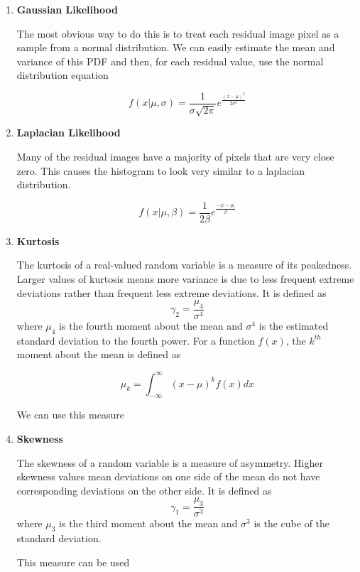 \begin{enumerate}
\item{\textbf{Gaussian Likelihood}}

The most obvious way to do this is to treat each residual image pixel as a sample from a normal distribution.  We can easily estimate the mean and variance of this PDF and then, for each residual value, use the normal distribution equation 

$$f(x|\mu,\sigma)=\frac{1}{\sigma\sqrt{2\pi}}e^{\frac{(x-\mu)^2}{2\sigma^2}}$$

 


\item{\textbf{Laplacian Likelihood}}

Many of the residual images have a majority of pixels that are very close zero.  This causes the histogram to look very similar to a laplacian distribution.

$$f(x|\mu,\beta)=\frac{1}{2\beta}e^{\frac{-|x-\mu|}{\beta}}$$

\item{\textbf{Kurtosis}}

The kurtosis of a real-valued random variable is a measure of its peakedness.  Larger values of kurtosis means more variance is due to less frequent extreme deviations rather than frequent less extreme deviations.  It is defined as $$\gamma_2=\frac{\mu_4}{\sigma^4}$$ where $\mu_4$ is the fourth moment about the mean and $\sigma^4$ is the estimated standard deviation to the fourth power.  For a function $f(x)$, the $k^{th}$ moment about the mean is defined as 

$$\mu_k = \int_{-\infty}^{\infty}{(x-\mu)^kf(x)dx}$$

We can use this measure 

\item{\textbf{Skewness}}

The skewness of a random variable is a measure of asymmetry.  Higher skewness values mean deviations on one side of the mean do not have corresponding deviations on the other side.  It is defined as $$\gamma_1=\frac{\mu_3}{\sigma^3}$$ where $\mu_3$ is the third moment about the mean and $\sigma^3$ is the cube of the standard deviation.

This measure can be used


\end{enumerate}


